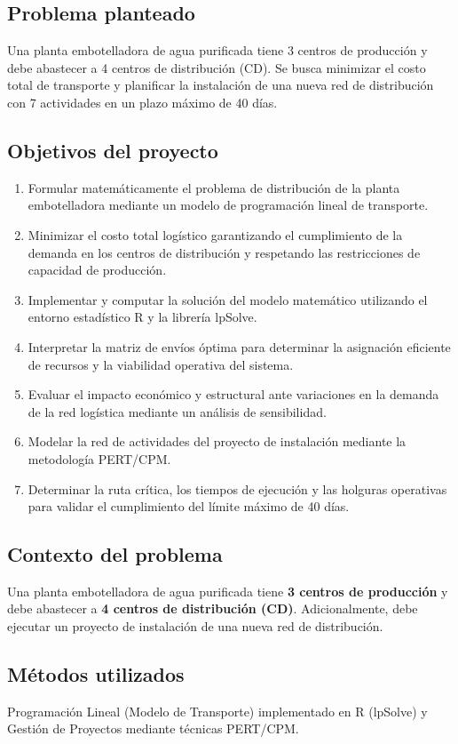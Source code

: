 \documentclass[12pt]{article}
\begin{document}
\subsection{Problema planteado}
Una planta embotelladora de agua purificada tiene 3 centros de producción y debe abastecer a 4 centros de distribución (CD). Se busca minimizar el costo total de transporte y planificar la instalación de una nueva red de distribución con 7 actividades en un plazo máximo de 40 días.

\subsection{Objetivos del proyecto}
\begin{enumerate}
 \item Formular matemáticamente el problema de distribución de la planta embotelladora mediante un modelo de programación lineal de transporte.
 \item Minimizar el costo total logístico garantizando el cumplimiento de la demanda en los centros de distribución y respetando las restricciones de capacidad de producción.
 \item Implementar y computar la solución del modelo matemático utilizando el entorno estadístico R y la librería lpSolve.
 \item Interpretar la matriz de envíos óptima para determinar la asignación eficiente de recursos y la viabilidad operativa del sistema.
 \item Evaluar el impacto económico y estructural ante variaciones en la demanda de la red logística mediante un análisis de sensibilidad.
 \item Modelar la red de actividades del proyecto de instalación mediante la metodología PERT/CPM.
 \item Determinar la ruta crítica, los tiempos de ejecución y las holguras operativas para validar el cumplimiento del límite máximo de 40 días.
\end{enumerate}

\subsection{Contexto del problema}
Una planta embotelladora de agua purificada tiene \textbf{3 centros de producción} y debe abastecer a \textbf{4 centros de distribución (CD)}. Adicionalmente, debe ejecutar un proyecto de instalación de una nueva red de distribución.

\subsection{Métodos utilizados}
Programación Lineal (Modelo de Transporte) implementado en R (lpSolve) y Gestión de Proyectos mediante técnicas PERT/CPM.
\end{document}
